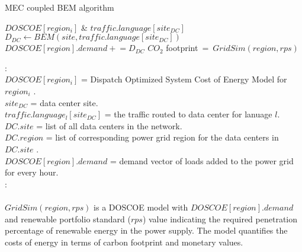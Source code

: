   \begin{algorithm}

    \caption{MEC coupled BEM algorithm}
    \begin{algorithmic}
    \begin{small}
      \REQUIRE $DOSCOE[region_i]$ \& $traffic.language[site_{DC}]$
        \STATE $D_{DC} \gets BEM(site, traffic.language[site_{DC}])$
        \STATE $DOSCOE[region].demand  \mathrel{+}=  D_{DC}$
        \ENDIF
      \ENDFOR
      \RETURN $CO_{2}$ {footprint}$\ =\ GridSim(region, rps)$
      
      \vspace{.1in}
      : \\
     
        \hspace{.2in} $DOSCOE[region_i]$ = Dispatch Optimized System Cost of Energy Model for $region_i$ \cite{platt17}.  \\
        \hspace{.2in} $site_{DC}$ = data center site. \\
        \hspace{.2in} $traffic.language_l[site_{DC}]$ = the traffic routed to data center for lanuage $l$.  \\
        \hspace{.2in} $DC.site$ = list of all data centers in the network. \\
        \hspace{.2in} $DC.region$ = list of corresponding power grid region for the data centers in $DC.site$ . \\
        \hspace{.2in}$DOSCOE[region].demand$ = demand vector of loads added to the power grid for every hour. \\
        \vspace{.1in}
        : \\
        \vspace{.05in}
        \hspace{.2in}{$BEM(site, traffic.language[site_{DC}])$ is a EnergyPlus model of the data center. As an external argument the traffic profile for the language to the data center is passed. The traffic profiles serve as coefficients for the IT load, bounded by 0 and 1.  The output is a vector indicating the building energy demands for each hour of the year.} \\
        \vspace{.05in}
        \hspace{.2in}$GridSim(region, rps)$ is a DOSCOE model with $DOSCOE[region].demand$ and renewable portfolio standard ($rps$) value indicating the required penetration percentage of renewable energy in the power supply. The model quantifies the costs of energy in terms of carbon footprint and monetary values. 
        \end{small}
    \end{algorithmic}
    \label{mec_coupled_bem_algo}

  \end{algorithm}
